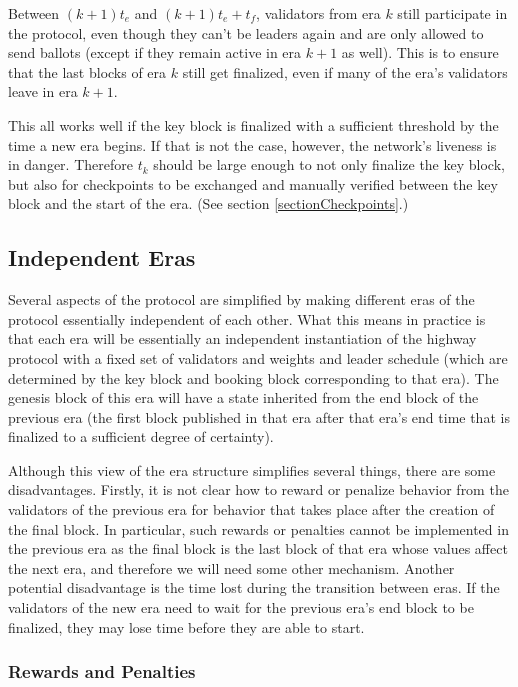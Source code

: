 \documentclass[12pt, fleqn]{article}
\begin{document}
Between $(k + 1) t_e$ and $(k + 1) t_e + t_f$, validators from era $k$ still participate in the protocol, even though they can't be leaders again and are only allowed to send ballots (except if they remain active in era $k + 1$ as well). This is to ensure that the last blocks of era $k$ still get finalized, even if many of the era's validators leave in era $k + 1$.

This all works well if the key block is finalized with a sufficient threshold by the time a new era begins. If that is not the case, however, the network's liveness is in danger. Therefore $t_k$ should be large enough to not only finalize the key block, but also for checkpoints to be exchanged and manually verified between the key block and the start of the era. (See section \ref{sectionCheckpoints}.)

\subsection{Independent Eras}

Several aspects of the protocol are simplified by making different eras of the protocol essentially independent of each other. What this means in practice is that each era will be essentially an independent instantiation of the highway protocol with a fixed set of validators and weights and leader schedule (which are determined by the key block and booking block corresponding to that era). The genesis block of this era will have a state inherited from the end block of the previous era (the first block published in that era after that era's end time that is finalized to a sufficient degree of certainty).

Although this view of the era structure simplifies several things, there are some disadvantages. Firstly, it is not clear how to reward or penalize behavior from the validators of the previous era for behavior that takes place after the creation of the final block. In particular, such rewards or penalties cannot be implemented in the previous era as the final block is the last block of that era whose values affect the next era, and therefore we will need some other mechanism. Another potential disadvantage is the time lost during the transition between eras. If the validators of the new era need to wait for the previous era's end block to be finalized, they may lose time before they are able to start.

\subsubsection{Rewards and Penalties}
\end{document}
